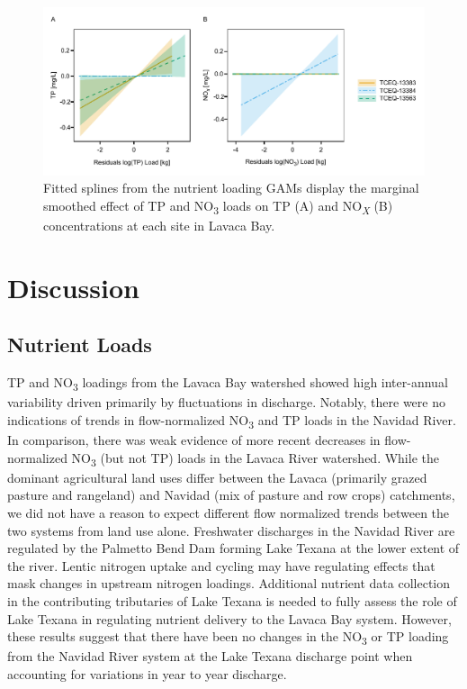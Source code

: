 \documentclass[fleqn,10pt,lineno]{wlpeerj} %
\begin{document}
\begin{figure}

{\centering \includegraphics[width=1\linewidth,]{Schramm-2023-08-PeerJ_files/figure-latex/fig7} 

}

\caption{Fitted splines from the nutrient loading GAMs display the marginal smoothed effect of TP and NO\textsubscript{3} loads on TP (A) and NO\textsubscript{\textit{X}} (B) concentrations at each site in Lavaca Bay.}\label{fig:fig7}
\end{figure}

\hypertarget{discussion}{%
\section*{Discussion}\label{discussion}}

\hypertarget{nutrient-loads}{%
\subsection*{Nutrient Loads}\label{nutrient-loads}}

TP and NO\textsubscript{3} loadings from the Lavaca Bay watershed showed
high inter-annual variability driven primarily by fluctuations in
discharge. Notably, there were no indications of trends in
flow-normalized NO\textsubscript{3} and TP loads in the Navidad River.
In comparison, there was weak evidence of more recent decreases in
flow-normalized NO\textsubscript{3} (but not TP) loads in the Lavaca
River watershed. While the dominant agricultural land uses differ
between the Lavaca (primarily grazed pasture and rangeland) and Navidad
(mix of pasture and row crops) catchments, we did not have a reason to
expect different flow normalized trends between the two systems from
land use alone. Freshwater discharges in the Navidad River are regulated
by the Palmetto Bend Dam forming Lake Texana at the lower extent of the
river. Lentic nitrogen uptake and cycling may have regulating effects
that mask changes in upstream nitrogen loadings. Additional nutrient
data collection in the contributing tributaries of Lake Texana is needed
to fully assess the role of Lake Texana in regulating nutrient delivery
to the Lavaca Bay system. However, these results suggest that there have
been no changes in the NO\textsubscript{3} or TP loading from the
Navidad River system at the Lake Texana discharge point when accounting
for variations in year to year discharge.
\end{document}
